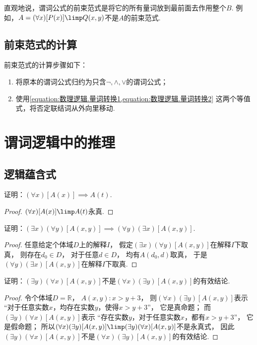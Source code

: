 直观地说，谓词公式的前束范式是将它的所有量词放到最前面去作用整个\(B\).
例如，\(A = (\forall x)[P(x)] \limp Q(x,y)\)不是\(A\)的前束范式.

\subsection{前束范式的计算}
前束范式的计算步骤如下：\begin{enumerate}
	\item 将原本的谓词公式归约为只含\(\neg,\land,\lor\)的谓词公式；
	\item 使用\cref{equation:数理逻辑.量词转换1,equation:数理逻辑.量词转换2}
	这两个等值式，将否定联结词从外向里移动.
\end{enumerate}

\section{谓词逻辑中的推理}
\subsection{逻辑蕴含式}
\begin{example}
证明：\((\forall x)[A(x)] \implies A(t)\).
\begin{proof}
\((\forall x)[A(x)] \limp A(t)\)永真.
\end{proof}
\end{example}

\begin{example}
证明：\((\exists x)(\forall y)[A(x,y)] \implies (\forall y)(\exists x)[A(x,y)]\).
\begin{proof}
任意给定个体域\(D\)上的解释\(I\)，
假定\((\exists x)(\forall y)[A(x,y)]\)在解释\(I\)下取真，
则存在\(d_0 \in D\)，
对于任意\(d \in D\)，
均有\(A(d_0,d)\)取真，
于是\((\forall y)(\exists x)[A(x,y)]\)在解释\(I\)下取真.
\end{proof}
\end{example}

\begin{example}
证明：\((\exists y)(\forall x)[A(x,y)]\)不是\((\forall x)(\exists y)[A(x,y)]\)的有效结论.
\begin{proof}
令个体域\(D=\mathbb{R}\)，
\(A(x,y): x>y+3\)，
则\((\forall x)(\exists y)[A(x,y)]\)表示
“对于任意实数\(x\)，均存在实数\(y\)，使得\(x>y+3\)”，
它是真命题；
而\((\exists y)(\forall x)[A(x,y)]\)表示
“存在实数\(y\)，对于任意实数\(x\)，都有\(x>y+3\)”，
它是假命题；
所以\((\forall x)(\exists y)[A(x,y)] \limp (\exists y)(\forall x)[A(x,y)]\)不是永真式，
因此\((\exists y)(\forall x)[A(x,y)]\)不是\((\forall x)(\exists y)[A(x,y)]\)的有效结论.
\end{proof}
\end{example}

